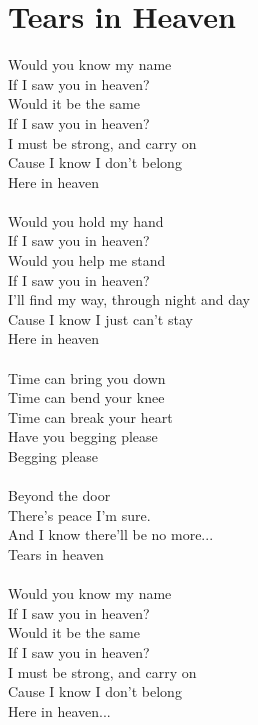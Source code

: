 \section{Tears in Heaven}
Would you know my name\\
If I saw you in heaven?\\
Would it be the same\\
If I saw you in heaven?\\
I must be strong, and carry on\\
Cause I know I don't belong\\
Here in heaven\\
\\
Would you hold my hand\\
If I saw you in heaven?\\
Would you help me stand\\
If I saw you in heaven?\\
I'll find my way, through night and day\\
Cause I know I just can't stay\\
Here in heaven\\
\\
Time can bring you down\\
Time can bend your knee\\
Time can break your heart\\
Have you begging please\\
Begging please\\
\\
Beyond the door\\
There's peace I'm sure.\\
And I know there'll be no more...\\
Tears in heaven\\
\\
Would you know my name\\
If I saw you in heaven?\\
Would it be the same\\
If I saw you in heaven?\\
I must be strong, and carry on\\
Cause I know I don't belong\\
Here in heaven...\\
